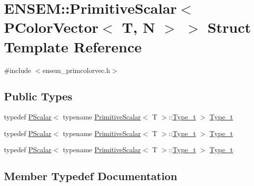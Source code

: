 \hypertarget{structENSEM_1_1PrimitiveScalar_3_01PColorVector_3_01T_00_01N_01_4_01_4}{}\section{E\+N\+S\+EM\+:\+:Primitive\+Scalar$<$ P\+Color\+Vector$<$ T, N $>$ $>$ Struct Template Reference}
\label{structENSEM_1_1PrimitiveScalar_3_01PColorVector_3_01T_00_01N_01_4_01_4}


{\ttfamily \#include $<$ensem\+\_\+primcolorvec.\+h$>$}

\subsection*{Public Types}
\begin{DoxyCompactItemize}
\item 
typedef \mbox{\hyperlink{classENSEM_1_1PScalar}{P\+Scalar}}$<$ typename \mbox{\hyperlink{structENSEM_1_1PrimitiveScalar}{Primitive\+Scalar}}$<$ T $>$\+::\mbox{\hyperlink{structENSEM_1_1PrimitiveScalar_3_01PColorVector_3_01T_00_01N_01_4_01_4_accc4860e90963b3b1cf8d72a9a4a7163}{Type\+\_\+t}} $>$ \mbox{\hyperlink{structENSEM_1_1PrimitiveScalar_3_01PColorVector_3_01T_00_01N_01_4_01_4_accc4860e90963b3b1cf8d72a9a4a7163}{Type\+\_\+t}}
\item 
typedef \mbox{\hyperlink{classENSEM_1_1PScalar}{P\+Scalar}}$<$ typename \mbox{\hyperlink{structENSEM_1_1PrimitiveScalar}{Primitive\+Scalar}}$<$ T $>$\+::\mbox{\hyperlink{structENSEM_1_1PrimitiveScalar_3_01PColorVector_3_01T_00_01N_01_4_01_4_accc4860e90963b3b1cf8d72a9a4a7163}{Type\+\_\+t}} $>$ \mbox{\hyperlink{structENSEM_1_1PrimitiveScalar_3_01PColorVector_3_01T_00_01N_01_4_01_4_accc4860e90963b3b1cf8d72a9a4a7163}{Type\+\_\+t}}
\item 
typedef \mbox{\hyperlink{classENSEM_1_1PScalar}{P\+Scalar}}$<$ typename \mbox{\hyperlink{structENSEM_1_1PrimitiveScalar}{Primitive\+Scalar}}$<$ T $>$\+::\mbox{\hyperlink{structENSEM_1_1PrimitiveScalar_3_01PColorVector_3_01T_00_01N_01_4_01_4_accc4860e90963b3b1cf8d72a9a4a7163}{Type\+\_\+t}} $>$ \mbox{\hyperlink{structENSEM_1_1PrimitiveScalar_3_01PColorVector_3_01T_00_01N_01_4_01_4_accc4860e90963b3b1cf8d72a9a4a7163}{Type\+\_\+t}}
\end{DoxyCompactItemize}


\subsection{Member Typedef Documentation}
\mbox{\label{structENSEM_1_1PrimitiveScalar_3_01PColorVector_3_01T_00_01N_01_4_01_4_accc4860e90963b3b1cf8d72a9a4a7163}} 
